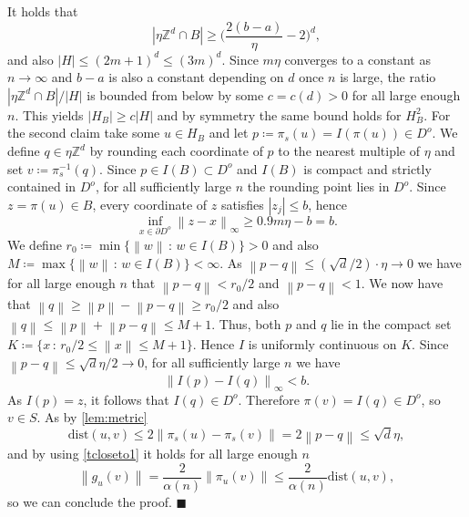 \documentclass[11pt]{article}%
\newenvironment{proof}{\vspace{1ex}\noindent{\bf Proof.}}{\hspace*{\fill}$\blacksquare$\vspace{1ex}}
\newcommand{\norm}[1]{\ensuremath{\left\|#1\right\|}}
\newcommand{\ZZ}{\mathbb{Z}}
\newcommand{\dists}{{\mathrm{dist}}}
\begin{document}
\begin{proof}
    It holds that
    \begin{equation*}
         |\eta \ZZ^d\cap B|\geq \bigg(\frac{2(b-a)}{\eta}-2\bigg)^d,
    \end{equation*}
    and also $|H|\leq (2m+1)^d\leq (3m)^d$. Since $m\eta $ converges to a constant as $n\to \infty$ and $b-a$ is also a constant depending on $d$ once $n $ is large, the ratio $|\eta \ZZ^d\cap B|/|H|$ is bounded from below by some $c=c(d)>0$ for all large enough $n$. This yields $|H_B|\geq c |H|$ and by symmetry the same bound holds for $H_B^2$. For the second claim take some $u\in H_B $ and let $p\coloneq \pi_s(u)=I(\pi(u))\in D^o$. We define $q\in \eta \ZZ^d$ by rounding each coordinate of $p$ to the nearest multiple of $\eta$ and set $v\coloneq \pi_s^{-1}(q)$. Since $p\in I(B)\subset D^o$ and $I(B)$ is compact and strictly contained in $D^o$, for all sufficiently large $n$ the rounding point lies in $D^o$. Since $z=\pi(u)\in B$, every coordinate of $z$ satisfies $|z_j|\leq b$, hence
    \begin{equation*} 
        \inf_{x\in \partial D^o}\norm{z-x}_\infty\geq 0.9 m \eta -b =b. 
    \end{equation*}
    We define $r_0\coloneqq\min\{\norm{w}\,:\,w\in I(B)\}>0$ and also $M\coloneqq\max\{\norm{w}\,:\, w\in I(B)\}<\infty$. As $\norm{p-q}\leq (\sqrt{d}/2)\cdot\eta\to 0$ we have for all large enough $n$ that $\norm{p-q}<r_0/2$ and $\norm{p-q}<1$. We now have that $\norm{q}\geq \norm{p}-\norm{p-q}\geq r_0/2$ and also $\norm{q}\leq \norm{p}+\norm{p-q}\leq M+1$. Thus, both $p$ and $q$ lie in the compact set $K\coloneq\{x\,:\, r_0/2\leq \norm{x}\leq M+1\}$. Hence $I$ is uniformly continuous on $K$. Since $\norm{p-q}\leq \sqrt{d} \eta /2\to 0$, for all sufficiently large $n$ we have
    \begin{equation*}
        \norm{I(p)-I(q)}_\infty <b.
    \end{equation*}
    As $I(p)=z$, it follows that $I(q)\in D^o$. Therefore $\pi(v)=I(q)\in D^o$, so $v\in S$. As by \cref{lem:metric} 
     \begin{equation*}
        \dists(u,v) \leq 2 \norm{\pi_s(u)-\pi_s(v)}=2\norm{p-q}\leq \sqrt{d}\eta,
     \end{equation*}
     and by using \cref{tcloseto1} it holds for all large enough $n$ 
     \begin{equation*}
         \norm{g_u(v)}= \frac{2}{\alpha(n)}\norm{\pi_u(v)}\leq \frac{2}{\alpha(n)}\dists(u,v),
     \end{equation*}
     so we can conclude the proof.
\end{proof}
\end{document}
